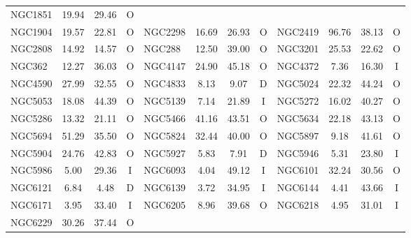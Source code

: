 \begin{table}
\begin{tabular}{l | c | c | c | l | c | c | c | l | c | c | c}
                NGC1851 &  19.94 &  29.46 &              O \\
                NGC1904 &  19.57 &  22.81 &              O &
                NGC2298 &  16.69 &  26.93 &              O &
                NGC2419 &  96.76 &  38.13 &              O \\
                NGC2808 &  14.92 &  14.57 &              O &
                NGC288 &  12.50 &  39.00 &              O &
                NGC3201 &  25.53 &  22.62 &              O \\
                NGC362 &  12.27 &  36.03 &              O &
                NGC4147 &  24.90 &  45.18 &              O &
                NGC4372 &   7.36 &  16.30 &              I \\
                NGC4590 &  27.99 &  32.55 &              O &
                NGC4833 &   8.13 &   9.07 &              D &
                NGC5024 &  22.32 &  44.24 &              O \\
                NGC5053 &  18.08 &  44.39 &              O &
                NGC5139 &   7.14 &  21.89 &              I &
                NGC5272 &  16.02 &  40.27 &              O \\
                NGC5286 &  13.32 &  21.11 &              O &
                NGC5466 &  41.16 &  43.51 &              O &
                NGC5634 &  22.18 &  43.13 &              O \\
                NGC5694 &  51.29 &  35.50 &              O &
                NGC5824 &  32.44 &  40.00 &              O &
                NGC5897 &   9.18 &  41.61 &              O \\
                NGC5904 &  24.76 &  42.83 &              O &
                NGC5927 &   5.83 &   7.91 &              D &
                NGC5946 &   5.31 &  23.80 &              I \\
                NGC5986 &   5.00 &  29.36 &              I &
                NGC6093 &   4.04 &  49.12 &              I &
                NGC6101 &  32.24 &  30.56 &              O \\
                NGC6121 &   6.84 &   4.48 &              D &
                NGC6139 &   3.72 &  34.95 &              I &
                NGC6144 &   4.41 &  43.66 &              I \\
                NGC6171 &   3.95 &  33.40 &              I &
                NGC6205 &   8.96 &  39.68 &              O &
                NGC6218 &   4.95 &  31.01 &              I \\
                NGC6229 &  30.26 &  37.44 &              O &

\end{tabular}
\end{table}
